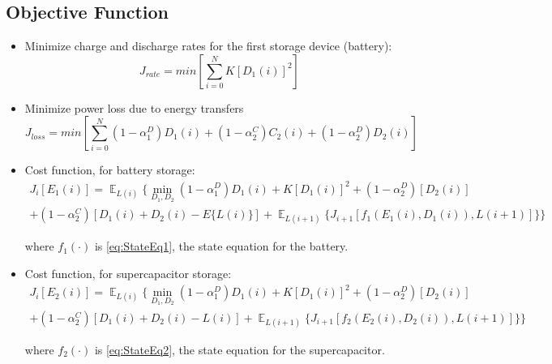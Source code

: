 \documentclass{article}
\begin{document}
	\subsection{Objective Function}
	\begin{itemize}
		\item Minimize charge and discharge rates
		 for the first storage device (battery):
		 \begin{equation}J_{rate}=min\left[\sum_{i=0}^{N}K\left[D_{1}(i)\right]^{2}\right]\end{equation}
 		\item Minimize power loss due to energy transfers
		 \begin{equation}J_{loss}=min\left[\sum_{i=0}^{N}
		 (1-\alpha_{1}^{D})D_{1}(i)+
		 (1-\alpha_{2}^{C})C_{2}(i)+
 		 (1-\alpha_{2}^{D})D_{2}(i)
		  \right]\end{equation}
		  
		  \item Cost function, for battery storage:\\
		  \begin{multline}
		  J_{i}[E_{1}(i)] = \mathop{\mathbb{E}}_{L(i)}
		  \{\min_{D_{1},D_{2}}
		  (1-\alpha_{1}^{D})D_{1}(i) 
		  	+ K[D_{1}(i)]^{2}
		  	+(1-\alpha_{2}^{D})[D_{2}(i)]\\	  +(1-\alpha_{2}^{C})[D_{1}(i)+D_{2}(i)-E\{L(i)\}]
		  	+\mathop{\mathbb{E}}_{L(i+1)}\{J_{i+1}[f_{1}(E_{1}(i),D_{1}(i)),L(i+1)]\}\}
		  \end{multline}
		  
		  where $f_{1}(\cdot)$ is \eqref{eq:StateEq1}, the state equation for the battery.
		  
		  \item Cost function, for supercapacitor storage:\\
		  \begin{multline}
		  J_{i}[E_{2}(i)] = \mathop{\mathbb{E}}_{L(i)} \{\min_{D_{1},D_{2}}
		  (1-\alpha_{1}^{D})D_{1}(i) 
		  	+ K[D_{1}(i)]^{2}
		  	+(1-\alpha_{2}^{D})[D_{2}(i)]\\	  +(1-\alpha_{2}^{C})[D_{1}(i)+D_{2}(i)-L(i)]
		  	+\mathop{\mathbb{E}}_{L(i+1)} \{J_{i+1}[f_{2}(E_{2}(i),D_{2}(i)),L(i+1)]\}\}
		  \end{multline}
		  
		  where $f_{2}(\cdot)$ is \eqref{eq:StateEq2}, the state equation for the supercapacitor.
	\end{itemize}
	
	
	
\end{document}
